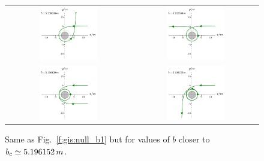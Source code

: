 \begin{figure}
\begin{tabular}{cc}
\includegraphics[width=0.48\textwidth]{ges_null_b_5_230000.pdf} &
\includegraphics[width=0.48\textwidth]{ges_null_b_5_202500.pdf} \\
\includegraphics[width=0.48\textwidth]{ges_null_b_5_196430.pdf} &
\includegraphics[width=0.48\textwidth]{ges_null_b_5_196155.pdf}
\end{tabular}
\caption[]{\label{f:gis:null_b2} \footnotesize
Same as Fig.~\ref{f:gis:null_b1} but for values of $b$ closer to
$b_{\rm c} \simeq 5.196152\, m$.}
\end{figure}

